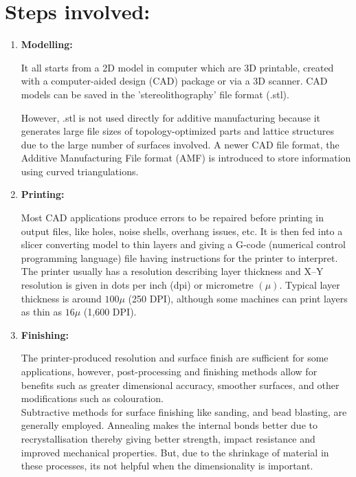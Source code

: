\documentclass{report}
\begin{document}
\section{Steps involved:}
\begin{enumerate}
    \item \textbf{Modelling:}
    
    It all starts from a 2D model in computer which are 3D printable, created with a computer-aided design (CAD) package or via a 3D scanner. CAD models can be saved in the 'stereolithography' file format (.stl).
    
    However, .stl is not used directly for additive manufacturing because it generates large file sizes of topology-optimized parts and lattice structures due to the large number of surfaces involved. A newer CAD file format, the Additive Manufacturing File format (AMF) is introduced to store information using curved triangulations.
    
    \item \textbf{Printing:}

    Most CAD applications produce errors to be repaired before printing in output files, like holes, noise shells, overhang issues, etc. It is then fed into a slicer converting model to thin layers and giving a G-code (numerical control programming language) file having instructions for the printer to interpret.
    \\The printer usually has a resolution describing layer thickness and X–Y resolution is given in dots per inch (dpi) or micrometre $(\mu)$. Typical layer thickness is around $100 \mu$ (250 DPI), although some machines can print layers as thin as $16 \mu$ (1,600 DPI).
    
    \item \textbf{Finishing:}
    
    The printer-produced resolution and surface finish are sufficient for some applications, however, post-processing and finishing methods allow for benefits such as greater dimensional accuracy, smoother surfaces, and other modifications such as colouration.
    \\Subtractive methods for surface finishing like sanding, and bead blasting, are generally employed. Annealing makes the internal bonds better due to recrystallisation thereby giving better strength, impact resistance and improved mechanical properties. But, due to the shrinkage of material in these processes, its not helpful when the dimensionality is important.
    
\end{enumerate}
\end{document}
